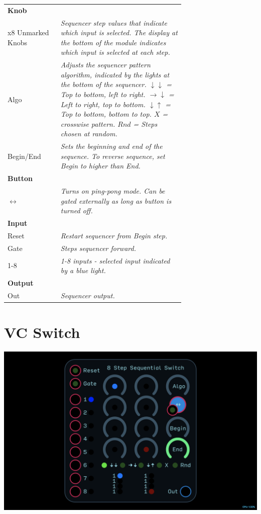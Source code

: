 \documentclass[11pt]{book}
\begin{document}
\begin{table}[ht]
\small
\sffamily
\renewcommand\arraystretch{1.5}
\centering
\begin{tabular}{l*{1}{>{\raggedright\arraybackslash}p{0.7\linewidth}}}

\toprule
\textbf{Knob} \\
x8 Unmarked Knobs & \textit{Sequencer step values that indicate which input is selected. The display at the bottom of the module indicates which input is selected at each step.} \\
Algo & \textit{Adjusts the sequencer pattern algorithm, indicated by the lights at the bottom of the sequencer. $\downarrow \downarrow$ = Top to bottom, left to right. $\rightarrow \downarrow$ = Left to right, top to bottom. $\downarrow \uparrow$ = Top to bottom, bottom to top. $X$ = crosswise pattern. $Rnd$ = Steps chosen at random.} \\
Begin/End & \textit{Sets the beginning and end of the sequence. To reverse sequence, set Begin to higher than End.} \\

\midrule
\textbf{Button} \\
$\leftrightarrow$ & \textit{Turns on ping-pong mode. Can be gated externally as long as button is turned off.} \\

\midrule
\textbf{Input} \\
Reset & \textit{Restart sequencer from Begin step.} \\
Gate & \textit{Steps sequencer forward.} \\
1-8 & \textit{1-8 inputs - selected input indicated by a blue light.} \\

\midrule
\textbf{Output} \\
Out & \textit{Sequencer output.} \\

\bottomrule
\end{tabular}
\end{table}%

\pagebreak


\section{VC Switch}

\includegraphics[width=\textwidth]{8-step-sequential-switch.png}
\end{document}
